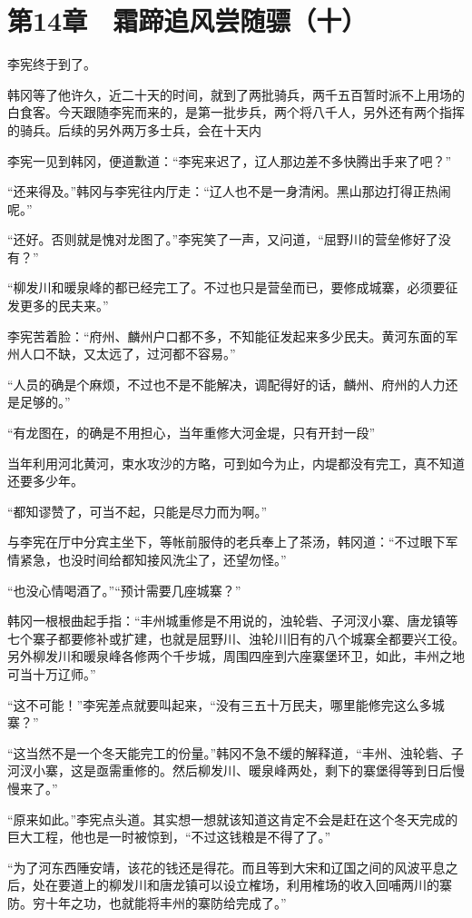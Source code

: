 \section{第14章　霜蹄追风尝随骠（十）}

李宪终于到了。

韩冈等了他许久，近二十天的时间，就到了两批骑兵，两千五百暂时派不上用场的白食客。今天跟随李宪而来的，是第一批步兵，两个将八千人，另外还有两个指挥的骑兵。后续的另外两万多士兵，会在十天内

李宪一见到韩冈，便道歉道：“李宪来迟了，辽人那边差不多快腾出手来了吧？”

“还来得及。”韩冈与李宪往内厅走：“辽人也不是一身清闲。黑山那边打得正热闹呢。”

“还好。否则就是愧对龙图了。”李宪笑了一声，又问道，“屈野川的营垒修好了没有？”

“柳发川和暖泉峰的都已经完工了。不过也只是营垒而已，要修成城寨，必须要征发更多的民夫来。”

李宪苦着脸：“府州、麟州户口都不多，不知能征发起来多少民夫。黄河东面的军州人口不缺，又太远了，过河都不容易。”

“人员的确是个麻烦，不过也不是不能解决，调配得好的话，麟州、府州的人力还是足够的。”

“有龙图在，的确是不用担心，当年重修大河金堤，只有开封一段”

当年利用河北黄河，束水攻沙的方略，可到如今为止，内堤都没有完工，真不知道还要多少年。

“都知谬赞了，可当不起，只能是尽力而为啊。”

与李宪在厅中分宾主坐下，等帐前服侍的老兵奉上了茶汤，韩冈道：“不过眼下军情紧急，也没时间给都知接风洗尘了，还望勿怪。”

“也没心情喝酒了。”“预计需要几座城寨？”

韩冈一根根曲起手指：“丰州城重修是不用说的，浊轮砦、子河汊小寨、唐龙镇等七个寨子都要修补或扩建，也就是屈野川、浊轮川旧有的八个城寨全都要兴工役。另外柳发川和暖泉峰各修两个千步城，周围四座到六座寨堡环卫，如此，丰州之地可当十万辽师。”

“这不可能！”李宪差点就要叫起来，“没有三五十万民夫，哪里能修完这么多城寨？”

“这当然不是一个冬天能完工的份量。”韩冈不急不缓的解释道，“丰州、浊轮砦、子河汊小寨，这是亟需重修的。然后柳发川、暖泉峰两处，剩下的寨堡得等到日后慢慢来了。”

“原来如此。”李宪点头道。其实想一想就该知道这肯定不会是赶在这个冬天完成的巨大工程，他也是一时被惊到，“不过这钱粮是不得了了。”

“为了河东西陲安靖，该花的钱还是得花。而且等到大宋和辽国之间的风波平息之后，处在要道上的柳发川和唐龙镇可以设立榷场，利用榷场的收入回哺两川的寨防。穷十年之功，也就能将丰州的寨防给完成了。”

